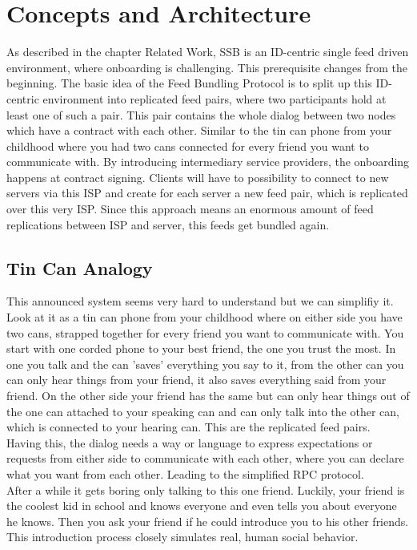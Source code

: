 \chapter{Concepts and Architecture}
As described in the chapter Related Work, SSB is an ID-centric single feed driven environment, where onboarding is challenging. 
This prerequisite changes from the beginning. The basic idea of the Feed Bundling Protocol is to split up this ID-centric environment into replicated feed pairs, where two participants hold at least one of such a pair.  This pair contains the whole dialog between two nodes which have a contract with each other. Similar to the tin can phone from your childhood where you had two cans connected for every friend you want to communicate with. By introducing intermediary service providers, the onboarding happens at contract signing. Clients will have to possibility to connect to new servers via this ISP and create for each server a new feed pair, which is replicated over this very ISP. Since this approach means an enormous amount of feed replications between ISP and server, this feeds get bundled again.

\section{Tin Can Analogy}
This announced system seems very hard to understand but we can simplifiy it. Look at it as a tin can phone from your childhood where on either side you have two cans, strapped together for every friend you want to communicate with. You start with one corded phone to your best friend, the one you trust the most. In one you talk and the can 'saves' everything you say to it, from the other can you can only hear things from your friend, it also saves everything said from your friend. On the other side your friend has the same but can only hear things out of the one can attached to your speaking can and can only talk into the other can, which is connected to your hearing can. This are the replicated feed pairs.\\

Having this, the dialog needs a way or language to express expectations or requests from either side to communicate with each other, where you can declare what you want from each other. Leading to the simplified RPC protocol.\\

After a while it gets boring only talking to this one friend. Luckily, your friend is the coolest kid in school and knows everyone and even tells you about everyone he knows. Then you ask your friend if he could introduce you to his other friends. This introduction process closely simulates real, human social behavior.\\


